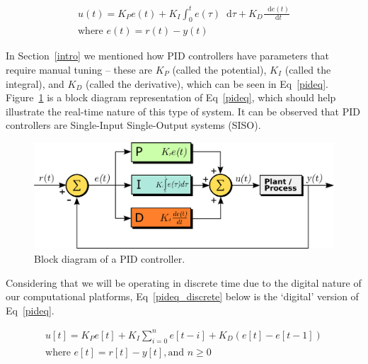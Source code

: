 \documentclass[10pt,twocolumn,letterpaper]{article}
\newcommand*\diff{\mathop{}\!\mathrm{d}} %
\begin{document}
        \begin{equation} \label{pideq}
            \begin{gathered}
                u(t) = K_P e(t) + K_I \int_0^t e(\tau) \diff\tau + K_D \frac{\diff e(t)}{\diff t} \\
                \text{where } e(t) = r(t) - y(t)
            \end{gathered}
        \end{equation}
        
        In Section~\ref{intro} we mentioned how PID controllers have parameters that require manual tuning -- these are
        $K_P$ (called the potential), $K_I$ (called the integral), and $K_D$ (called the derivative), which can be seen
        in Eq~\ref{pideq}. Figure~\ref{pidblock} is a block diagram representation of Eq~\ref{pideq}, which should help
        illustrate the real-time nature of this type of system. It can be observed that PID controllers are Single-Input
        Single-Output systems (SISO).
        
        \begin{figure}[h]
            \includegraphics[width=\linewidth]{./figures/pidBlock.jpg}
            \centering
            \caption{Block diagram of a PID controller.\cite{wikipediaPIDdiagram}}
            \label{pidblock}
        \end{figure}

        Considering that we will be operating in discrete time due to the digital nature of our computational platforms,
        Eq~\ref{pideq_discrete} below is the `digital' version of Eq~\ref{pideq}.
        
        \begin{equation} \label{pideq_discrete}
            \begin{gathered}
                u[t] = K_P e[t] + K_I \sum_{i=0}^n e[t-i] + K_D \left(e[t]-e[t-1]\right) \\
                \text{where } e[t] = r[t] - y[t], \text{and $n \geq 0$}
            \end{gathered}
        \end{equation}
\end{document}
